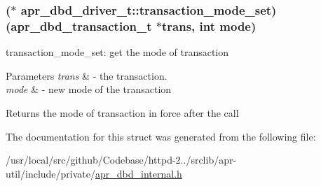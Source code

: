 \subsubsection[{\texorpdfstring{transaction\+\_\+mode\+\_\+set}{transaction_mode_set}}]{($\ast$ apr\+\_\+dbd\+\_\+driver\+\_\+t\+::transaction\+\_\+mode\+\_\+set) ({\bf apr\+\_\+dbd\+\_\+transaction\+\_\+t} $\ast${\bf trans}, {\bf int} {\bf mode})}\hypertarget{structapr__dbd__driver__t_a81620ae15072e50976ddca1808efbba4}{}\label{structapr__dbd__driver__t_a81620ae15072e50976ddca1808efbba4}
transaction\+\_\+mode\+\_\+set\+: get the mode of transaction


\begin{DoxyParams}{Parameters}
{\em trans} & -\/ the transaction. \\
\hline
{\em mode} & -\/ new mode of the transaction \\
\hline
\end{DoxyParams}
\begin{DoxyReturn}{Returns}
the mode of transaction in force after the call 
\end{DoxyReturn}


The documentation for this struct was generated from the following file\+:\begin{DoxyCompactItemize}
\item 
/usr/local/src/github/\+Codebase/httpd-\/2../srclib/apr-\/util/include/private/\hyperlink{apr__dbd__internal_8h}{apr\+\_\+dbd\+\_\+internal.\+h}\end{DoxyCompactItemize}
